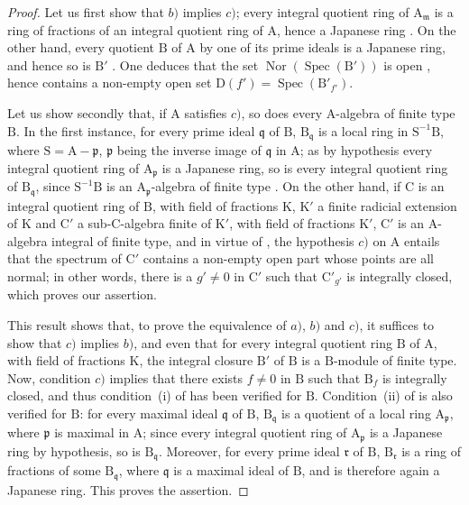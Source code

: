 \begin{proof}
Let us first show that $b)$ implies $c)$; every integral quotient ring of $\mathrm{A}_\mathfrak{m}$ is a ring of fractions of an integral quotient ring of $\mathrm{A}$, hence a Japanese ring . On the other hand, every quotient $\mathrm{B}$ of $\mathrm{A}$ by one of its prime ideals is a Japanese ring, and hence so is $\mathrm{B}'$ . One deduces that the set $\operatorname{Nor}(\operatorname{Spec}(\mathrm{B}'))$ is open , hence contains a non-empty open set $\mathrm{D}(f')=\operatorname{Spec}(\mathrm{B}'_{f'})$.


Let us show secondly that, if $\mathrm{A}$ satisfies $c)$, so does every $\mathrm{A}$-algebra of finite type $\mathrm{B}$. In the first instance, for every prime ideal $\mathfrak{q}$ of $\mathrm{B}$, $\mathrm{B}_\mathfrak{q}$ is a local ring in $\mathrm{S}^{-1}\mathrm{B}$, where $\mathrm{S}=\mathrm{A}-\mathfrak{p}$, $\mathfrak{p}$ being the inverse image of $\mathfrak{q}$ in $\mathrm{A}$; as by hypothesis every integral quotient ring of $\mathrm{A}_\mathfrak{p}$ is a Japanese ring, so is every integral quotient ring of $\mathrm{B}_\mathfrak{q}$, since $\mathrm{S}^{-1}\mathrm{B}$ is an $\mathrm{A}_\mathfrak{p}$-algebra of finite type . On the other hand, if $\mathrm{C}$ is an integral quotient ring of $\mathrm{B}$, with field of fractions $\mathrm{K}$, $\mathrm{K}'$ a finite radicial extension of $\mathrm{K}$ and $\mathrm{C}'$ a sub-$\mathrm{C}$-algebra finite of $\mathrm{K}'$, with field of fractions $\mathrm{K}'$, $\mathrm{C}'$ is an $\mathrm{A}$-algebra integral of finite type, and in virtue of , the hypothesis $c)$ on $\mathrm{A}$ entails that the spectrum of $\mathrm{C}'$ contains a non-empty open part whose points are all normal; in other words, there is a $g'\neq 0$ in $\mathrm{C}'$ such that $\mathrm{C}'_{g'}$ is integrally closed, which proves our assertion.

This result shows that, to prove the equivalence of $a)$, $b)$ and $c)$, it suffices to show that $c)$ implies $b)$, and even that for every integral quotient ring $\mathrm{B}$ of $\mathrm{A}$, with field of fractions $\mathrm{K}$, the integral closure $\mathrm{B}'$ of $\mathrm{B}$ is a $\mathrm{B}$-module of finite type. Now, condition $c)$ implies that there exists $f\neq0$ in $\mathrm{B}$ such that $\mathrm{B}_f$ is integrally closed, and thus condition~(i) of  has been verified for $\mathrm{B}$. Condition~(ii) of  is also verified for $\mathrm{B}$: for every maximal ideal $\mathfrak{q}$ of $\mathrm{B}$, $\mathrm{B}_\mathfrak{q}$ is a quotient of a local ring $\mathrm{A}_\mathfrak{p}$, where $\mathfrak{p}$ is maximal in $\mathrm{A}$; since every integral quotient ring of $\mathrm{A}_\mathfrak{p}$ is a Japanese ring by hypothesis, so is $\mathrm{B}_\mathfrak{q}$. Moreover, for every prime ideal $\mathfrak{r}$ of $\mathrm{B}$, $\mathrm{B}_\mathfrak{r}$ is a ring of fractions of some $\mathrm{B}_\mathfrak{q}$, where $\mathfrak{q}$ is a maximal ideal of $\mathrm{B}$, and is therefore again a Japanese ring. This proves the assertion.


\end{proof}
